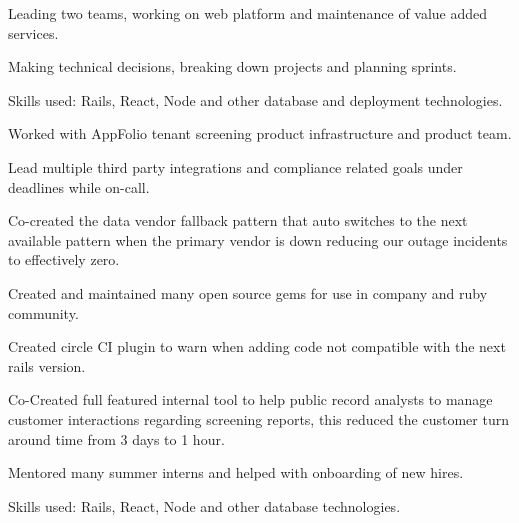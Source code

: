    \begin{tightemize}
      \item Leading two teams, working on web platform and maintenance of value added services.
      \item Making technical decisions, breaking down projects and planning sprints.
      \item Skills used: Rails, React, Node and other database and deployment technologies.
    \end{tightemize} 
    \sectionsep

    \begin{tightemize}
      \item Worked with AppFolio tenant screening product infrastructure and product team.
      \item Lead multiple third party integrations and compliance related goals under deadlines while on-call.
      \item Co-created the data vendor fallback pattern that auto switches to the next available pattern when the primary vendor is down reducing our outage incidents to effectively zero.
      \item Created and maintained many open source gems for use in company and ruby community.
      \item Created circle CI plugin to warn when adding code not compatible with the next rails version.
      \item Co-Created full featured internal tool to help public record analysts to manage customer interactions regarding screening reports, this reduced the customer turn around time from 3 days to 1 hour.
      \item Mentored many summer interns and helped with onboarding of new hires.
      \item Skills used: Rails, React, Node and other database technologies.
    \end{tightemize} 
    \sectionsep


